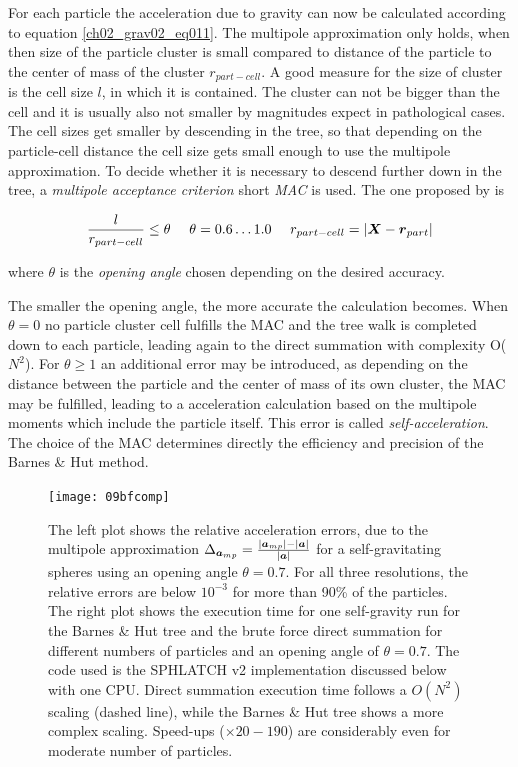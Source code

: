 For each particle the acceleration due to gravity can now be calculated according to equation \ref{ch02_grav02_eq011}. The multipole approximation only holds, when then size of the particle cluster is small compared to distance of the particle to the center of mass of the cluster $r_{part- cell}$. A good measure for the size of cluster is the cell size $l$, in which it is contained. The cluster can not be bigger than the cell and it is usually also not smaller by magnitudes expect in pathological cases. The cell sizes get smaller by descending in the tree, so that depending on the particle-cell distance the cell size gets small enough to use the multipole approximation. To decide whether it is necessary to descend further down in the tree, a \emph{multipole acceptance criterion} short \emph{MAC} is used. The one proposed by \cite{1986Natur.324..446B} is

\begin{equation}
\label{ch02_grav02_eq013}
\frac{l}{r_{part-cell}} \le \theta ~~~~ \theta = 0.6 \dots 1.0 ~~~~ r_{part-cell} = | \boldsymbol{X} - \boldsymbol{r}_{part}|
\end{equation}

where $\theta$ is the \emph{opening angle} chosen depending on the desired accuracy. 


The smaller the opening angle, the more accurate the calculation becomes. When $\theta = 0$ no particle cluster cell fulfills the MAC and the tree walk is completed down to each particle, leading again to the direct summation with complexity O($N^2$). For $\theta \ge 1$ an additional error may be introduced, as depending on the distance between the particle and the center of mass of its own cluster, the MAC may be fulfilled, leading to a acceleration calculation based on the multipole moments which include the particle itself. This error is called \emph{self-acceleration}. The choice of the MAC determines directly the efficiency and precision of the Barnes \& Hut method. 

\begin{figure}[htbp]
\begin{center}
\texttt{[image: 09bfcomp]}
\caption{The left plot shows the relative acceleration errors, due to the multipole approximation $\Delta_{\boldsymbol{a}_{mp}} = \frac{|\boldsymbol{a}_{mp}| - |\boldsymbol{a}|}{|\boldsymbol{a}|}$ for a self-gravitating spheres using an opening angle $\theta = 0.7$. For all three resolutions, the relative errors are below $10^{-3}$ for more than 90\% of the particles. 
The right plot shows the execution time for one self-gravity run for the Barnes \& Hut tree and the brute force direct summation for different numbers of particles and an opening angle of $\theta = 0.7$. The code used is the SPHLATCH v2 implementation discussed below with one CPU. Direct summation execution time follows a $O(N^2)$ scaling (dashed line), while the Barnes \& Hut tree shows a more complex scaling. Speed-ups ($\times 20-190$) are considerably even for moderate number of particles.}
\label{ch02_grav02_fig03}
\end{center}
\end{figure}


